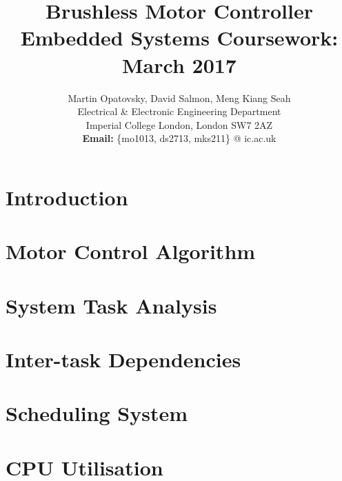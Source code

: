 \documentclass[a4paper, 10pt, conference]{ieeeconf}
\title{\LARGE \bf Brushless Motor Controller
\\ \normalsize Embedded Systems Coursework: March 2017}
\author{Martin Opatovsky, David Salmon, Meng Kiang Seah\\
Electrical \& Electronic Engineering Department\\
Imperial College London, London SW7 2AZ\\
\textbf{Email:} \{mo1013, ds2713, mks211\} @ ic.ac.uk\\
}
\begin{document}
\maketitle

\begin{abstract}

\end{abstract}

\section{Introduction}


\section{Motor Control Algorithm}


\section{System Task Analysis}


\section{Inter-task Dependencies}


\section{Scheduling System}


\section{CPU Utilisation}




\end{document}
